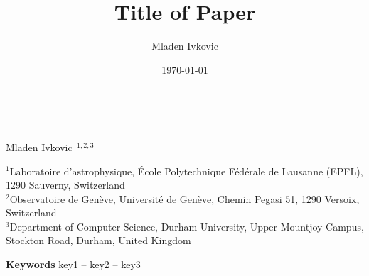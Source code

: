 




\title{Title of Paper}
\author{Mladen Ivkovic}
\date{\today}








\nocite{*} %



\onecolumn



\begin{center}
\begin{Huge}
	\textbf{\MyTitle}\\
\end{Huge}
\end{center}

\vspace{.5cm}

\begin{Large}
Mladen Ivkovic $^{\,1,2,3}$ \\
\end{Large}

$^{1}$Laboratoire d'astrophysique, \'{E}cole Polytechnique F\'{e}d\'{e}rale de Lausanne (EPFL), 1290
Sauverny, Switzerland\\
$^{2}$Observatoire de Gen\`{e}ve, Universit\'{e} de Gen\`{e}ve, Chemin Pegasi 51, 1290 Versoix,
Switzerland\\
$^{3}$Department of Computer Science, Durham University, Upper Mountjoy Campus, Stockton Road,  Durham,
United Kingdom\\

\vspace{.5cm}



\vspace{.5cm}

\textbf{Keywords} key1 -- key2 -- key3


